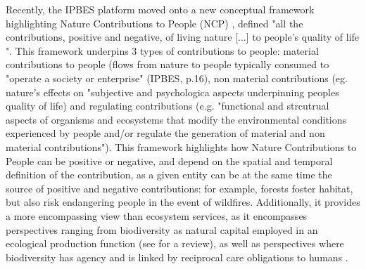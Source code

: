 Recently, the IPBES platform moved onto a new conceptual framework highlighting Nature Contributions to People (NCP) \citep{DIAZ20151}, defined "all the contributions, positive and negative, of living nature [...] to people's quality of life \citep{diaz_2018}". This framework underpins 3 types of contributions to people: material contributions to people (flows from nature to people typically consumed to "operate a society or enterprise" (IPBES, p.16), non material contributions (eg. nature's effects on "subjective and psychologica aspects underpinning peoples quality of life) and regulating contributions (e.g. "functional and strcutrual aspects of organisms and ecosystems that modify the environmental conditions experienced by people and/or regulate the generation of material and non material contributions"). This framework highlights how Nature Contributions to People can be positive or negative, and depend on the spatial and temporal definition of the contribution, as a given entity can be at the same time the source of positive and negative contributions: for example, forests foster habitat, but also risk endangering people in the event of wildfires. Additionally, it provides a more encompassing view than ecosystem services, as it encompasses perspectives ranging from biodiversity as natural capital employed in an ecological production function (see \cite{polasky_integrating_2009} for a review), as well as perspectives where biodiversity has agency and is linked by reciprocal care obligations to humans \citep{descola}. 


